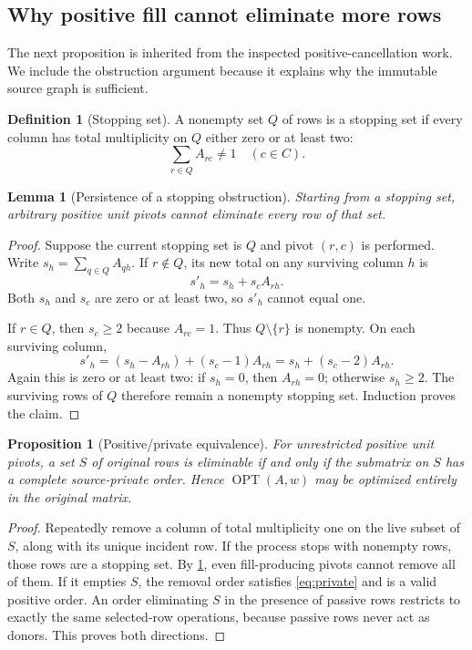 \documentclass[11pt,letterpaper]{article}
\newtheorem{lemma}[lemma]{Lemma}\aliascntresetthe{lemma}
\newtheorem{proposition}[proposition]{Proposition}\aliascntresetthe{proposition}
\theoremstyle{definition}
\newtheorem{definition}[definition]{Definition}\aliascntresetthe{definition}
\theoremstyle{remark}
\newcommand{\OPT}{\operatorname{OPT}}
\begin{document}
\subsection{Why positive fill cannot eliminate more rows}
The next proposition is inherited from the inspected positive-cancellation work. We include the obstruction argument because it explains why the immutable source graph is sufficient.

\begin{definition}[Stopping set]
A nonempty set $Q$ of rows is a stopping set if every column has total multiplicity on $Q$ either zero or at least two:
\[
 \sum_{r\in Q}A_{rc}\ne1\quad(c\in C).
\]
\end{definition}

\begin{lemma}[Persistence of a stopping obstruction]
\label{lem:stopping}
Starting from a stopping set, arbitrary positive unit pivots cannot eliminate every row of that set.
\end{lemma}
\begin{proof}
Suppose the current stopping set is $Q$ and pivot $(r,c)$ is performed. Write $s_h=\sum_{q\in Q}A_{qh}$. If $r\notin Q$, its new total on any surviving column $h$ is
\[
 s'_h=s_h+s_c A_{rh}.
\]
Both $s_h$ and $s_c$ are zero or at least two, so $s'_h$ cannot equal one.

If $r\in Q$, then $s_c\ge2$ because $A_{rc}=1$. Thus $Q\setminus\{r\}$ is nonempty. On each surviving column,
\[
 s'_h=(s_h-A_{rh})+(s_c-1)A_{rh}
      =s_h+(s_c-2)A_{rh}.
\]
Again this is zero or at least two: if $s_h=0$, then $A_{rh}=0$; otherwise $s_h\ge2$. The surviving rows of $Q$ therefore remain a nonempty stopping set. Induction proves the claim.
\end{proof}

\begin{proposition}[Positive/private equivalence]
\label{prop:equivalence}
For unrestricted positive unit pivots, a set $S$ of original rows is eliminable if and only if the submatrix on $S$ has a complete source-private order. Hence $\OPT(A,w)$ may be optimized entirely in the original matrix.
\end{proposition}
\begin{proof}
Repeatedly remove a column of total multiplicity one on the live subset of $S$, along with its unique incident row. If the process stops with nonempty rows, those rows are a stopping set. By \cref{lem:stopping}, even fill-producing pivots cannot remove all of them. If it empties $S$, the removal order satisfies \cref{eq:private} and is a valid positive order. An order eliminating $S$ in the presence of passive rows restricts to exactly the same selected-row operations, because passive rows never act as donors. This proves both directions.
\end{proof}
\end{document}
